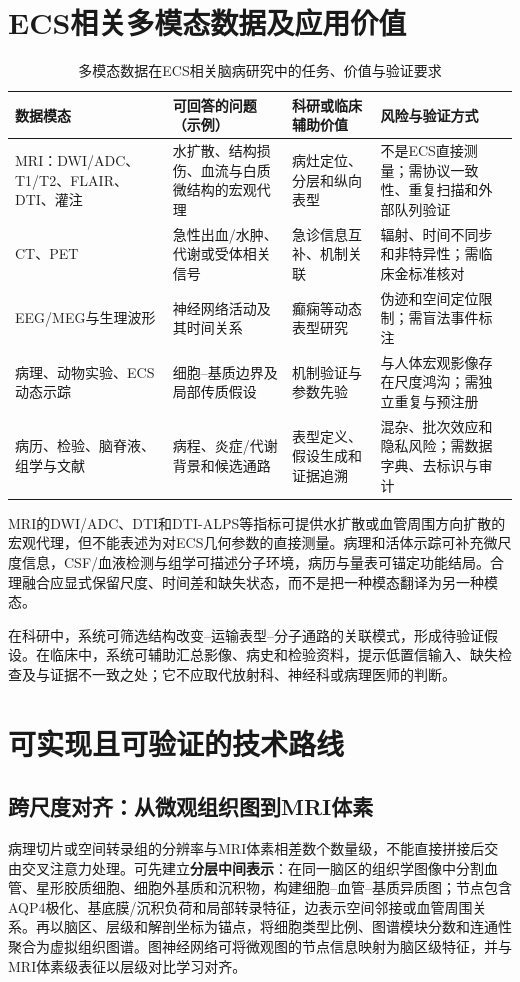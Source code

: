 ﻿\documentclass[11pt,a4paper]{article}
\begin{document}
\section{ECS相关多模态数据及应用价值}
\begin{table}[htbp]\centering\small
\caption{多模态数据在ECS相关脑病研究中的任务、价值与验证要求\label{tab:data}}
\begin{tabularx}{\linewidth}{p{2.2cm}Y Y Y}\toprule
数据模态 & 可回答的问题（示例） & 科研或临床辅助价值 & 风险与验证方式\\\midrule
MRI：DWI/ADC、T1/T2、FLAIR、DTI、灌注 & 水扩散、结构损伤、血流与白质微结构的宏观代理 & 病灶定位、分层和纵向表型 & 不是ECS直接测量；需协议一致性、重复扫描和外部队列验证\\
CT、PET & 急性出血/水肿、代谢或受体相关信号 & 急诊信息互补、机制关联 & 辐射、时间不同步和非特异性；需临床金标准核对\\
EEG/MEG与生理波形 & 神经网络活动及其时间关系 & 癫痫等动态表型研究 & 伪迹和空间定位限制；需盲法事件标注\\
病理、动物实验、ECS动态示踪 & 细胞--基质边界及局部传质假设 & 机制验证与参数先验 & 与人体宏观影像存在尺度鸿沟；需独立重复与预注册\\
病历、检验、脑脊液、组学与文献 & 病程、炎症/代谢背景和候选通路 & 表型定义、假设生成和证据追溯 & 混杂、批次效应和隐私风险；需数据字典、去标识与审计\\\bottomrule
\end{tabularx}
\end{table}

MRI的DWI/ADC、DTI和DTI-ALPS等指标可提供水扩散或血管周围方向扩散的宏观代理，但不能表述为对ECS几何参数的直接测量\cite{taoka2021}。病理和活体示踪可补充微尺度信息，CSF/血液检测与组学可描述分子环境，病历与量表可锚定功能结局。合理融合应显式保留尺度、时间差和缺失状态，而不是把一种模态翻译为另一种模态。

在科研中，系统可筛选结构改变--运输表型--分子通路的关联模式，形成待验证假设。在临床中，系统可辅助汇总影像、病史和检验资料，提示低置信输入、缺失检查及与证据不一致之处；它不应取代放射科、神经科或病理医师的判断。

\section{可实现且可验证的技术路线}

\subsection{跨尺度对齐：从微观组织图到MRI体素}
病理切片或空间转录组的分辨率与MRI体素相差数个数量级，不能直接拼接后交由交叉注意力处理。可先建立\textbf{分层中间表示}：在同一脑区的组织学图像中分割血管、星形胶质细胞、细胞外基质和沉积物，构建细胞--血管--基质异质图；节点包含AQP4极化、基底膜/沉积负荷和局部转录特征，边表示空间邻接或血管周围关系。再以脑区、层级和解剖坐标为锚点，将细胞类型比例、图谱模块分数和连通性聚合为虚拟组织图谱。图神经网络可将微观图的节点信息映射为脑区级特征，并与MRI体素级表征以层级对比学习对齐\cite{kipf2017}。
\end{document}
